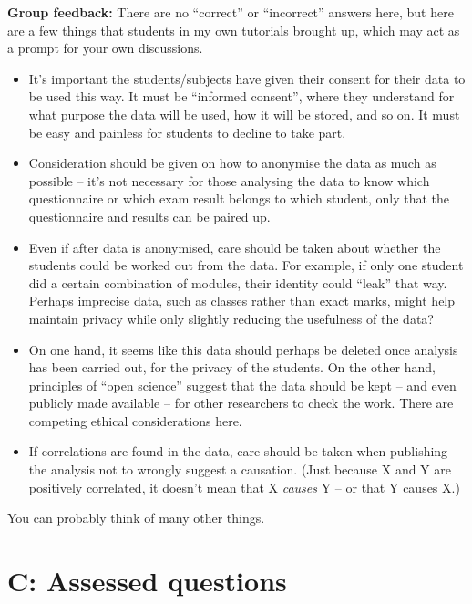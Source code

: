 \documentclass[
  a4paper,
]{book}
\theoremstyle{definition}
\theoremstyle{definition}
\theoremstyle{definition}
\theoremstyle{definition}
\theoremstyle{remark}
\begin{document}
\begin{myanswers}
\textbf{Group feedback:} There are no ``correct'' or ``incorrect'' answers here, but here are a few things that students in my own tutorials brought up, which may act as a prompt for your own discussions.

\begin{itemize}
\item
  It's important the students/subjects have given their consent for their data to be used this way. It must be ``informed consent'', where they understand for what purpose the data will be used, how it will be stored, and so on. It must be easy and painless for students to decline to take part.
\item
  Consideration should be given on how to anonymise the data as much as possible -- it's not necessary for those analysing the data to know which questionnaire or which exam result belongs to which student, only that the questionnaire and results can be paired up.
\item
  Even if after data is anonymised, care should be taken about whether the students could be worked out from the data. For example, if only one student did a certain combination of modules, their identity could ``leak'' that way. Perhaps imprecise data, such as classes rather than exact marks, might help maintain privacy while only slightly reducing the usefulness of the data?
\item
  On one hand, it seems like this data should perhaps be deleted once analysis has been carried out, for the privacy of the students. On the other hand, principles of ``open science'' suggest that the data should be kept -- and even publicly made available -- for other researchers to check the work. There are competing ethical considerations here.
\item
  If correlations are found in the data, care should be taken when publishing the analysis not to wrongly suggest a causation. (Just because X and Y are positively correlated, it doesn't mean that X \emph{causes} Y -- or that Y causes X.)
\end{itemize}

You can probably think of many other things.

\end{myanswers}

\hypertarget{P1-assessed}{%
\section*{C: Assessed questions}\label{P1-assessed}}
\end{document}
